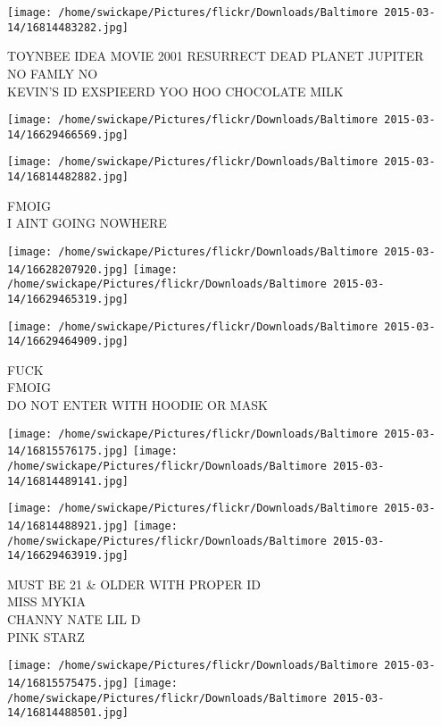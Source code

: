 \documentclass[10pt,letterpaper]{article}
\begin{document}
\texttt{[image: /home/swickape/Pictures/flickr/Downloads/Baltimore 2015-03-14/16814483282.jpg]}

TOYNBEE IDEA MOVIE 2001 RESURRECT DEAD PLANET JUPITER\\
NO FAMLY NO\\
KEVIN'S ID EXSPIEERD YOO HOO CHOCOLATE MILK\\
\pagebreak

\texttt{[image: /home/swickape/Pictures/flickr/Downloads/Baltimore 2015-03-14/16629466569.jpg]}

\vspace{0.25in}
\texttt{[image: /home/swickape/Pictures/flickr/Downloads/Baltimore 2015-03-14/16814482882.jpg]}

FMOIG\\
I AINT GOING NOWHERE\\
\pagebreak

\texttt{[image: /home/swickape/Pictures/flickr/Downloads/Baltimore 2015-03-14/16628207920.jpg]}
\texttt{[image: /home/swickape/Pictures/flickr/Downloads/Baltimore 2015-03-14/16629465319.jpg]}

\vspace{0.25in}
\texttt{[image: /home/swickape/Pictures/flickr/Downloads/Baltimore 2015-03-14/16629464909.jpg]}

FUCK\\
FMOIG\\
DO NOT ENTER WITH HOODIE OR MASK\\
\pagebreak

\texttt{[image: /home/swickape/Pictures/flickr/Downloads/Baltimore 2015-03-14/16815576175.jpg]}
\texttt{[image: /home/swickape/Pictures/flickr/Downloads/Baltimore 2015-03-14/16814489141.jpg]}

\texttt{[image: /home/swickape/Pictures/flickr/Downloads/Baltimore 2015-03-14/16814488921.jpg]}
\texttt{[image: /home/swickape/Pictures/flickr/Downloads/Baltimore 2015-03-14/16629463919.jpg]}

MUST BE 21 \& OLDER WITH PROPER ID\\
MISS MYKIA\\
CHANNY NATE LIL D\\
PINK STARZ\\
\pagebreak

\texttt{[image: /home/swickape/Pictures/flickr/Downloads/Baltimore 2015-03-14/16815575475.jpg]}
\texttt{[image: /home/swickape/Pictures/flickr/Downloads/Baltimore 2015-03-14/16814488501.jpg]}
\end{document}
